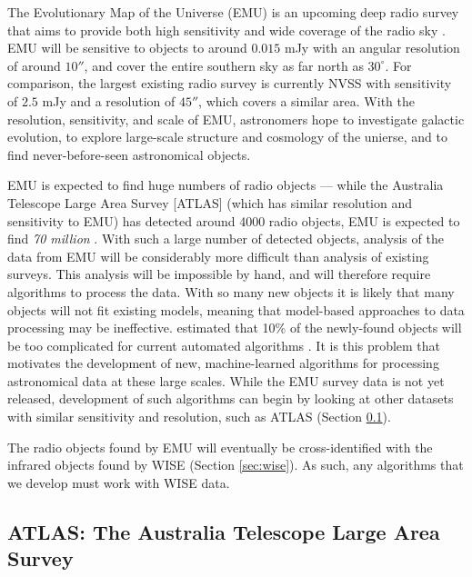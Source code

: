             The Evolutionary Map of the Universe (EMU) is an upcoming deep radio
            survey that aims to provide both high sensitivity and wide coverage
            of the radio sky \citep{norris11}. EMU will be sensitive to objects
            to around $0.015$ mJy with an angular resolution of around $10''$,
            and cover the entire southern sky as far north as $30^\circ$. For
            comparison, the largest existing radio survey is currently NVSS
            \citep{condon98} with sensitivity of $2.5$ mJy and a resolution of
            $45''$, which covers a similar area. With the resolution,
            sensitivity, and scale of EMU, astronomers hope to investigate
            galactic evolution, to explore large-scale structure and cosmology
            of the unierse, and to find never-before-seen astronomical objects.

            EMU is expected to find huge numbers of radio objects --- while the
            Australia Telescope Large Area Survey [ATLAS] (which has similar
            resolution and sensitivity to EMU) has detected around 4000 radio
            objects, EMU is expected to find \emph{70 million}
            \citep{banfield15}. With such a large number of detected objects,
            analysis of the data from EMU will be considerably more difficult
            than analysis of existing surveys. This analysis will be impossible
            by hand, and will therefore require algorithms to process the data.
            With so many new objects it is likely that many objects will not fit
            existing models, meaning that model-based approaches to data
            processing may be ineffective. \citet{norris11} estimated that 10\%
            of the newly-found objects will be too complicated for current
            automated algorithms \citep{banfield15}. It is this problem that
            motivates the development of new, machine-learned algorithms for
            processing astronomical data at these large scales. While the EMU
            survey data is not yet released, development of such algorithms can
            begin by looking at other datasets with similar sensitivity and
            resolution, such as ATLAS (Section \ref{sec:atlas}).

            The radio objects found by EMU will eventually be cross-identified
            with the infrared objects found by WISE (Section \ref{sec:wise}). As
            such, any algorithms that we develop must work with WISE data.

        \subsection{ATLAS: The Australia Telescope Large Area Survey}
        \label{sec:atlas}

